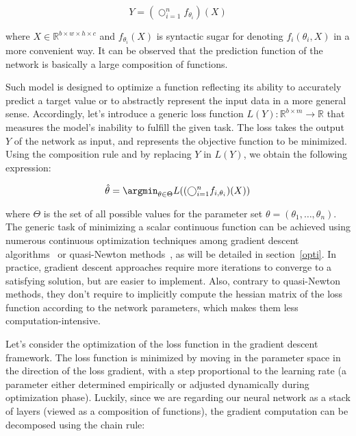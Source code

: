         \begin{equation}
            Y = (\bigcirc_{i=1}^{n} f_{\theta_i})(X)
        \end{equation}

        where $X \in \mathbb{R}^{b \times w \times h \times c}$ and $f_{\theta_i}(X)$
        is syntactic sugar for denoting $f_i(\theta_i, X)$ in a more convenient way. It can be observed that the prediction
        function of the network is basically a large composition of functions.

        Such model is designed to optimize a function reflecting its ability to accurately predict a target value or to abstractly represent the input
        data in a more general sense. Accordingly, let's introduce a generic loss function
        $L(Y): \mathbb{R}^{b \times m} \rightarrow \mathbb{R}$ that measures
        the model's inability to fulfill the given task.
        The loss takes the output $Y$ of the network as input, and represents the objective function to be minimized.
        Using the composition rule and by replacing $Y$ in $L(Y)$, we obtain the following expression:

        \begin{equation}
            \hat{\theta} = \argmin_{\theta \in \Theta} L((\bigcirc_{i=1}^{n} f_{i, \theta_i})(X))
        \end{equation}

        where $\Theta$ is the set of all possible values for the parameter set $\theta = (\theta_1, \ldots, \theta_n)$.
        The generic task of minimizing a scalar continuous function can be achieved
        using numerous continuous optimization techniques among gradient descent algorithms~\cite{DBLP:journals/corr/Ruder16}
        or quasi-Newton methods~\cite{LBFGS}, as will be detailed in section~\ref{opti}.
        In practice, gradient descent approaches require more iterations to converge to a satisfying solution,
        but are easier to implement. Also, contrary to quasi-Newton methods,
        they don't require to implicitly compute the hessian matrix of the loss
        function according to the network parameters, which makes them less computation-intensive.
        
        Let's consider the optimization of the loss function in the gradient descent framework.
        The loss function is minimized by moving in the parameter space in the direction of the loss gradient, with
        a step proportional to the learning rate (a parameter either determined empirically
        or adjusted dynamically during optimization phase).
        Luckily, since we are regarding our neural network as a stack of layers
        (viewed as a composition of functions), the gradient computation can be decomposed using the chain rule:

